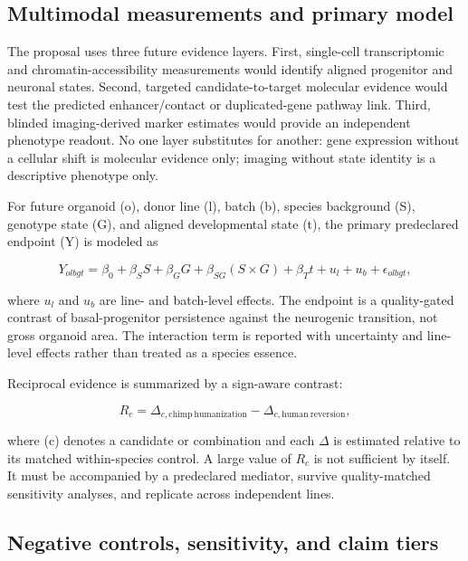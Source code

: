 \documentclass[conference]{IEEEtran}
\begin{document}
\subsection{Multimodal measurements and primary model}

The proposal uses three future evidence layers. First, single-cell transcriptomic and chromatin-accessibility measurements would identify aligned progenitor and neuronal states. Second, targeted candidate-to-target molecular evidence would test the predicted enhancer/contact or duplicated-gene pathway link. Third, blinded imaging-derived marker estimates would provide an independent phenotype readout. No one layer substitutes for another: gene expression without a cellular shift is molecular evidence only; imaging without state identity is a descriptive phenotype only.

For future organoid (o), donor line (l), batch (b), species background (S), genotype state (G), and aligned developmental state (t), the primary predeclared endpoint (Y) is modeled as

\begin{equation}
Y_{olbgt}=\beta_0+\beta_SS+\beta_GG+\beta_{SG}(S\times G)+\beta_Tt+u_l+u_b+\epsilon_{olbgt},
\label{eq:primary}
\end{equation}

where \(u_l\) and \(u_b\) are line- and batch-level effects. The endpoint is a quality-gated contrast of basal-progenitor persistence against the neurogenic transition, not gross organoid area. The interaction term is reported with uncertainty and line-level effects rather than treated as a species essence.

Reciprocal evidence is summarized by a sign-aware contrast:

\begin{equation}
R_c=\Delta_{c,\mathrm{chimp\ humanization}}-\Delta_{c,\mathrm{human\ reversion}},
\label{eq:reciprocity}
\end{equation}

where (c) denotes a candidate or combination and each \(\Delta\) is estimated relative to its matched within-species control. A large value of \(R_c\) is not sufficient by itself. It must be accompanied by a predeclared mediator, survive quality-matched sensitivity analyses, and replicate across independent lines.

\subsection{Negative controls, sensitivity, and claim tiers}
\end{document}
